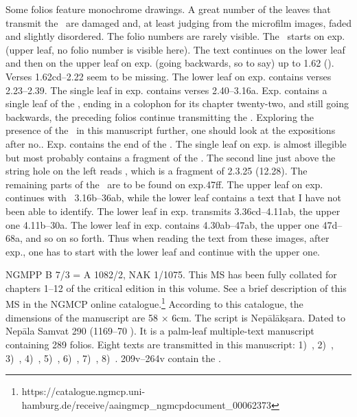 Some folios feature monochrome drawings. A great number of the leaves that transmit the \VSS\ are damaged and, 
at least judging from the microfilm images, 
faded and slightly disordered. The folio numbers are
rarely visible. The \VSS\ starts on exp. 
(upper leaf, no folio number is visible here). 
The text continues on the lower leaf and then on the upper
leaf on exp. (going backwards, so to say) 
up to 1.62 (). 
Verses 1.62cd--2.22 seem to be missing. The lower leaf on
exp. contains verses 2.23--2.39. 
The single leaf in exp. contains
verses 2.40--3.16a. Exp. contains a single leaf of the
, ending in a colophon for its chapter
twenty-two, and still going backwards, the preceding folios continue
transmitting the 
. 
Exploring the presence of
the \VSS\ in this manuscript further, 
one should look at the expositions
after no.. Exp. contains the end of the
. The
single leaf on exp. 
is almost illegible but most probably contains a
fragment of the 
. 
The second line just above
the string hole on the left reads  , which is a fragment of
 2.3.25 (12.28). 
The remaining parts of the \VSS\
are to be found on exp.ff. 
The upper leaf on exp.\thinspace47 continues with
\VSS\ 3.16b--36ab, while the lower leaf contains a text that I have not
been able to identify. The lower leaf in exp.\thinspace48 transmits
3.36cd--4.11ab, the upper one 4.11b--30a. The lower leaf in 
exp. contains 4.30ab--47ab, 
the upper one 47d--68a, and so on so forth. Thus
when reading the text from these images, after exp., 
one has to start with the lower leaf and continue with the upper one.


NGMPP B 7/3 = A 1082/2, NAK 1/1075. This MS has been 
fully collated for chapters 1--12 of
the critical edition in this volume. See a brief description of this MS
in the NGMCP online catalogue.\footnote{https://catalogue.ngmcp.uni-hamburg.de/receive/aaingmcp\_ngmcpdocument\_00062373}
According to this catalogue, the dimensions of the manuscript are 
58 × 6cm. The script is Nepālākṣara. Dated to Nepāla Samvat 
290 (1169--70 \CE). It is a
palm-leaf multiple-text manuscript containing 289 folios. Eight texts
are transmitted in this manuscript: 
1)~,
2)~, 
3)~, 
4)~, 
5)~,
6)~,
7)~,
8)~. 
\Fols209v--264v contain the \VSS.


